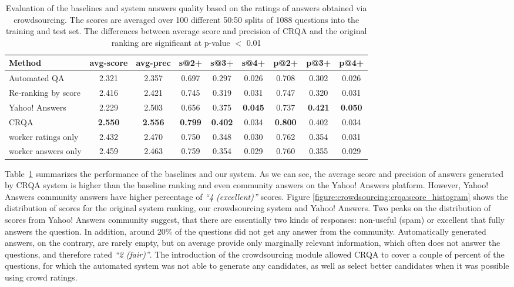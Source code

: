 \begin{table}[ht]
\centering
\begin{tabular}{| p{4.2cm} | c | c | c | c | c | c | c | c |}
\hline
Method & avg-score & avg-prec & s@2+ & s@3+ & s@4+ & p@2+ & p@3+ & p@4+ \\
\hline
Automated QA & 2.321 & 2.357 & 0.697 & 0.297 & 0.026 & 0.708 & 0.302 & 0.026 \\
Re-ranking by score & 2.416 & 2.421 & 0.745 & 0.319 & 0.031 & 0.747 & 0.320 & 0.031 \\
Yahoo! Answers & 2.229 & 2.503 & 0.656 & 0.375 & \textbf{0.045} & 0.737 & \textbf{0.421} & \textbf{0.050} \\
CRQA & \textbf{2.550} & \textbf{2.556} & \textbf{0.799} & \textbf{0.402} & 0.034 & \textbf{0.800} & 0.402 & 0.034 \\
\hspace{5mm}worker ratings only & 2.432 & 2.470 & 0.750 & 0.348 & 0.030 & 0.762 & 0.354 & 0.031 \\
\hspace{5mm}worker answers only & 2.459 & 2.463 & 0.759 & 0.354 & 0.029 & 0.760 & 0.355 & 0.029 \\
\hline
\end{tabular}
\caption{Evaluation of the baselines and system answers quality based on the ratings of answers obtained via crowdsourcing. The scores are averaged over 100 different 50:50 splits of 1088 questions into the training and test set. The differences between average score and precision of CRQA and the original ranking are significant at p-value $<$ 0.01}
\label{table:crowdsourcing:crqa:performance}
\end{table}

Table~\ref{table:crowdsourcing:crqa:performance} summarizes the performance of the baselines and our system.
As we can see, the average score and precision of answers generated by CRQA system is higher than the baseline ranking and even community answers on the Yahoo! Answers platform.
However, Yahoo! Answers community answers have higher percentage of \textit{``4 (excellent)''} scores.
Figure \ref{figure:crowdsourcing:crqa:score_histogram} shows the distribution of scores for the original system ranking, our crowdsourcing system and Yahoo! Answers.
Two peaks on the distribution of scores from Yahoo! Answers community suggest, that there are essentially two kinds of responses: non-useful (\eg spam) or excellent that fully answers the question.
In addition, around 20\% of the questions did not get any answer from the community.
Automatically generated answers, on the contrary, are rarely empty, but on average provide only marginally relevant information, which often does not answer the questions, and therefore rated \textit{``2 (fair)''}.
The introduction of the crowdsourcing module allowed CRQA to cover a couple of percent of the questions, for which the automated system was not able to generate any candidates, as well as select better candidates when it was possible using crowd ratings.

